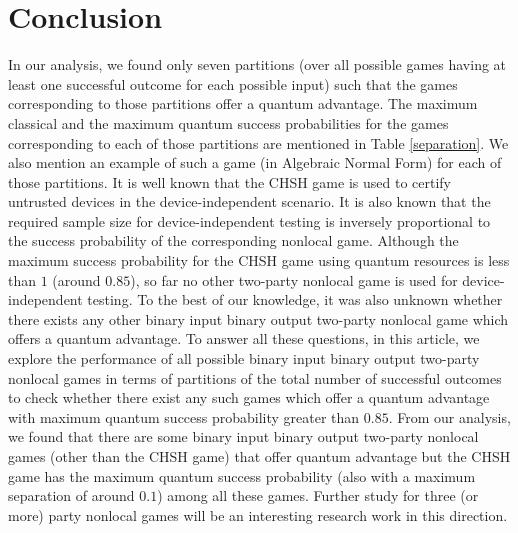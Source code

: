 \documentclass[]{svjour3}
\begin{document}
\section{Conclusion}
\label{concl}
 In our analysis, we found only seven partitions (over all possible games having at least one successful outcome for each possible input) such that the games corresponding to those partitions offer a quantum advantage. The maximum classical and the maximum quantum success probabilities for the games corresponding to each of those partitions are mentioned in Table \ref{separation}. We also mention an example of such a game (in Algebraic Normal Form) for each of those partitions. It is well known that the CHSH game is used to certify untrusted devices in the device-independent scenario. It is also known that the required sample size for device-independent testing is inversely proportional to the success probability of the corresponding nonlocal game. Although the maximum success probability for the CHSH game using quantum resources is less than $1$ (around $0.85$), so far no other two-party nonlocal game is used for device-independent testing. To the best of our knowledge, it was also unknown whether there exists any other binary input binary output two-party nonlocal game which offers a quantum advantage. To answer all these questions, in this article, we explore the performance of all possible binary input binary output two-party nonlocal games in terms of partitions of the total number of successful outcomes to check whether there exist any such games which offer a quantum advantage with maximum quantum success probability greater than $0.85$. From our analysis, we found that there are some binary input binary output two-party nonlocal games (other than the CHSH game) that offer quantum advantage but the CHSH game has the maximum quantum success probability (also with a maximum separation of around $0.1$) among all these games. Further study for three (or more) party nonlocal games will be an interesting research work in this direction.
\end{document}
